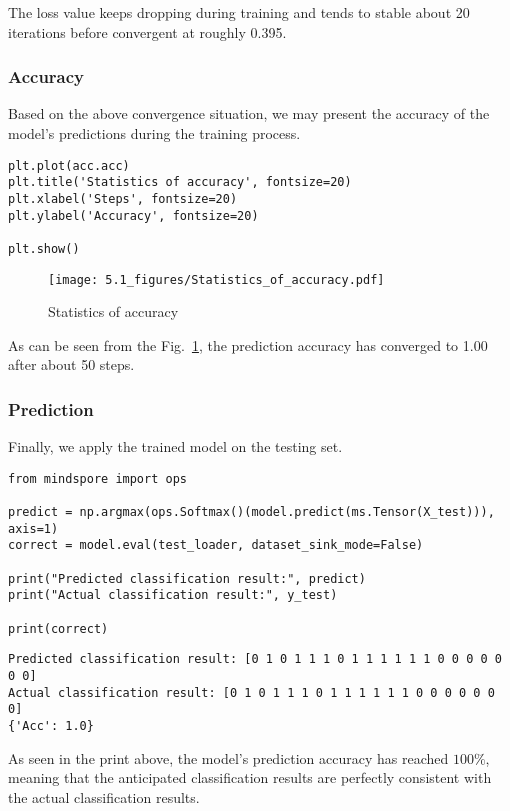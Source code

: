 The loss value keeps dropping during training and tends to stable about 20 iterations before convergent at roughly 0.395.

\subsubsection{Accuracy}
Based on the above convergence situation, we may present the accuracy of the model's predictions during the training process. %

\begin{lstlisting}
plt.plot(acc.acc)
plt.title('Statistics of accuracy', fontsize=20)
plt.xlabel('Steps', fontsize=20)
plt.ylabel('Accuracy', fontsize=20)

plt.show()
\end{lstlisting}

\begin{figure}[H]
    \centering
    \texttt{[image: 5.1\_figures/Statistics\_of\_accuracy.pdf]}
    \caption{Statistics of accuracy}
    \label{5.1Statistics_of_accuracy}
\end{figure}

As can be seen from the Fig.~\ref{5.1Statistics_of_accuracy}, the prediction accuracy has converged to 1.00 after about 50 steps.

\subsubsection{Prediction}
Finally, we apply the trained model on the testing set.
\begin{lstlisting}
from mindspore import ops

predict = np.argmax(ops.Softmax()(model.predict(ms.Tensor(X_test))), axis=1)
correct = model.eval(test_loader, dataset_sink_mode=False)

print("Predicted classification result:", predict)
print("Actual classification result:", y_test)

print(correct)
\end{lstlisting}

\begin{lstlisting}
Predicted classification result: [0 1 0 1 1 1 0 1 1 1 1 1 1 0 0 0 0 0 0 0]
Actual classification result: [0 1 0 1 1 1 0 1 1 1 1 1 1 0 0 0 0 0 0 0]
{'Acc': 1.0}
\end{lstlisting}

As seen in the print above, the model's prediction accuracy has reached $100\%$, meaning that the anticipated classification results are perfectly consistent with the actual classification results.
